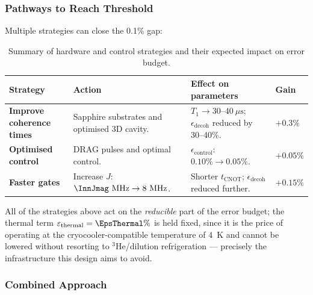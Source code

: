 \subsubsection{Pathways to Reach Threshold}

Multiple strategies can close the 0.1\% gap:

\begin{table}[t]
\centering
\small %
\renewcommand{\arraystretch}{1.15} %
\setlength{\tabcolsep}{5pt} %
\caption{Summary of hardware and control strategies and their expected impact on error budget.}
\label{tab:strategies}

\begin{tabular}{@{}p{}p{}p{}p{}@{}}
\toprule
\textbf{Strategy} & \textbf{Action} & \textbf{Effect on parameters} & \textbf{Gain} \\
\midrule
\textbf{Improve coherence times} &
Sapphire substrates and optimised 3D cavity. &
$T_1 \rightarrow 30$--$40~\mu\text{s}$; $\epsilon_{\mathrm{decoh}}$ reduced by 30--40\%. &
$+0.3\%$ \\[0.4ex]

\textbf{Optimised control} &
DRAG pulses and optimal control. &
$\epsilon_{\mathrm{control}}$: $0.10\% \rightarrow 0.05\%$. &
$+0.05\%$ \\[0.4ex]

\textbf{Faster gates} &
Increase $J$: $\InnJmag~\text{MHz} \rightarrow 8~\text{MHz}$. &
Shorter $t_{\mathrm{CNOT}}$; $\epsilon_{\mathrm{decoh}}$ reduced further. &
$+0.15\%$ \\
\bottomrule
\end{tabular}
\end{table}

\noindent
All of the strategies above act on the \emph{reducible} part of the error
budget; the thermal term $\varepsilon_{\mathrm{thermal}}=\EpsThermal\%$ is held
fixed, since it is the price of operating at the cryocooler-compatible
temperature of $4$~K and cannot be lowered without resorting to
$^3$He/dilution refrigeration --- precisely the infrastructure this design aims
to avoid.

\subsubsection{Combined Approach}

